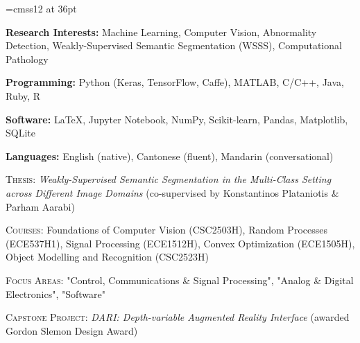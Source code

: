\documentclass[11pt]{cv_style}
\begin{document}
\font\titlefont=cmss12 at 36pt


\begin{ditem}
	\item \textbf{Research Interests:} Machine Learning, Computer Vision, Abnormality Detection, Weakly-Supervised Semantic Segmentation (WSSS), Computational Pathology
	\item \textbf{Programming:} Python (Keras, TensorFlow, Caffe), MATLAB, C/C++, Java, Ruby, R
	\item \textbf{Software:} \LaTeX, Jupyter Notebook, NumPy, Scikit-learn, Pandas, Matplotlib, SQLite
	\item \textbf{Languages:} English (native), Cantonese (fluent), Mandarin (conversational)
\end{ditem}

\flushleft{}
\begin{ditem}
	\item \textsc{Thesis:} \textit{Weakly-Supervised Semantic Segmentation in the Multi-Class Setting across Different Image Domains} (co-supervised by Konstantinos Plataniotis \& Parham Aarabi)
	\item \textsc{Courses:} Foundations of Computer Vision (CSC2503H), Random Processes (ECE537H1), Signal Processing (ECE1512H), Convex Optimization (ECE1505H), Object Modelling and Recognition (CSC2523H)
\end{ditem}
\medspace
{}
\begin{ditem}
	\item \textsc{Focus Areas:} "Control, Communications \& Signal Processing", "Analog \& Digital Electronics", "Software"
	\item \textsc{Capstone Project:} \textit{DARI: Depth-variable Augmented Reality Interface} (awarded Gordon Slemon Design Award)
\end{ditem}
\end{document}
